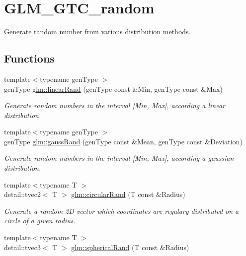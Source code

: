 \hypertarget{group__gtc__random}{\section{G\-L\-M\-\_\-\-G\-T\-C\-\_\-random}
\label{group__gtc__random}
}


Generate random number from various distribution methods.  


\subsection*{Functions}
\begin{DoxyCompactItemize}
\item 
{\footnotesize template$<$typename gen\-Type $>$ }\\gen\-Type \hyperlink{group__gtc__random_ga4fbce21c9727ffcd7f19813d6d7d8024}{glm\-::linear\-Rand} (gen\-Type const \&Min, gen\-Type const \&Max)
\begin{DoxyCompactList}\small\item\em Generate random numbers in the interval \mbox{[}Min, Max\mbox{]}, according a linear distribution. \end{DoxyCompactList}\item 
{\footnotesize template$<$typename gen\-Type $>$ }\\gen\-Type \hyperlink{group__gtc__random_ga8cf40a2f2268b91103f763b6ea2c44d8}{glm\-::gauss\-Rand} (gen\-Type const \&Mean, gen\-Type const \&Deviation)
\begin{DoxyCompactList}\small\item\em Generate random numbers in the interval \mbox{[}Min, Max\mbox{]}, according a gaussian distribution. \end{DoxyCompactList}\item 
{\footnotesize template$<$typename T $>$ }\\detail\-::tvec2$<$ T $>$ \hyperlink{group__gtc__random_ga6e74477d1997a1bc2cf62bcc36167674}{glm\-::circular\-Rand} (T const \&Radius)
\begin{DoxyCompactList}\small\item\em Generate a random 2\-D vector which coordinates are regulary distributed on a circle of a given radius. \end{DoxyCompactList}\item 
{\footnotesize template$<$typename T $>$ }\\detail\-::tvec3$<$ T $>$ \hyperlink{group__gtc__random_ga291f75129653fa6371d2d57d78f8aca6}{glm\-::spherical\-Rand} (T const \&Radius)

\end{DoxyCompactItemize}
